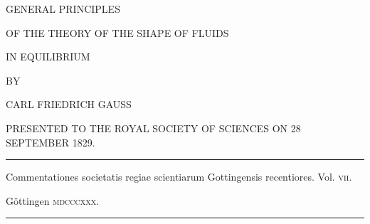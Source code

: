 \clearpage
\thispagestyle{empty}
\begin{center}
\vspace*{.7in}
{\large GENERAL PRINCIPLES\par}
\bigskip
{\Large OF THE THEORY OF THE SHAPE OF FLUIDS\par}
\bigskip
{\Large IN EQUILIBRIUM\par}
\vspace{.6in}
{\small BY\par}
\bigskip
CARL FRIEDRICH GAUSS\par
\bigskip
{\small PRESENTED TO THE ROYAL SOCIETY OF SCIENCES ON 28 SEPTEMBER 1829.\par}
\vfill
\rule{.8\textwidth}{.3pt}\par
\medskip
{\small Commentationes societatis regiae scientiarum Gottingensis recentiores. Vol. \textsc{vii}.\par}
Göttingen \textsc{mdcccxxx}.\par
\medskip
\rule{.8\textwidth}{.3pt}\par
\end{center}
\clearpage
